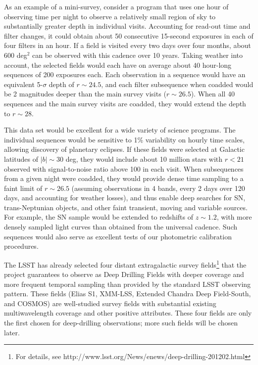 \documentclass{emulateapj}
\begin{document}
As an example of a mini-survey, consider a program that uses one hour of
observing time per night to observe a relatively small region of sky to
substantially greater depth in individual visits. Accounting for
read-out time and filter changes, it could obtain about 50 consecutive
15-second exposures in each of four filters in an hour. If a field is visited
every two days over four months, about 600 deg$^2$ can be observed with this 
cadence over 10 years. Taking weather into account, the selected fields would 
each have on average about 40 hour-long sequences of 200 exposures each. Each 
observation in a sequence would have an equivalent 5-$\sigma$ depth of
$r\sim24.5$, and each filter subsequence when coadded would be 2 magnitudes 
deeper than the main survey visits ($r\sim26.5$). When all 40 sequences and 
the main survey visits are coadded, they would extend the depth to $r\sim28$. 

This data set would be excellent for a wide variety of science programs. The 
individual sequences would be sensitive to 1\% variability on hourly time 
scales, allowing discovery of planetary eclipses. If these fields were selected 
at Galactic latitudes of $|b|\sim30$ deg, they would include about 10 million 
stars with $r<21$ observed with signal-to-noise ratio above 100 in each visit.
When subsequences from a given night were coadded, they would 
provide dense time sampling to a faint limit of $r\sim26.5$ (assuming observations
in 4 bands, every 2 days over 120 days, and accounting for weather losses), and thus 
enable deep searches 
for SN, trans-Neptunian objects, and other faint transient, moving and 
variable sources.  For example, the SN sample
would be extended to redshifts of $z\sim1.2$, with more densely sampled light
curves than obtained from the universal cadence. Such sequences would also
serve as excellent tests of our photometric calibration procedures. 

The LSST has already selected four distant extragalactic survey fields\footnote{For
details, see http://www.lsst.org/News/enews/deep-drilling-201202.html}
that the project guarantees to observe as Deep Drilling Fields with deeper coverage 
and more frequent temporal sampling than provided by the standard LSST observing 
pattern. These fields (Elias S1, XMM-LSS, Extended Chandra Deep Field-South, and
COSMOS) are  well-studied survey fields with substantial existing multiwavelength 
coverage and other positive attributes. These four fields are only the first chosen 
for deep-drilling observations; more such fields will be chosen later.
\end{document}
